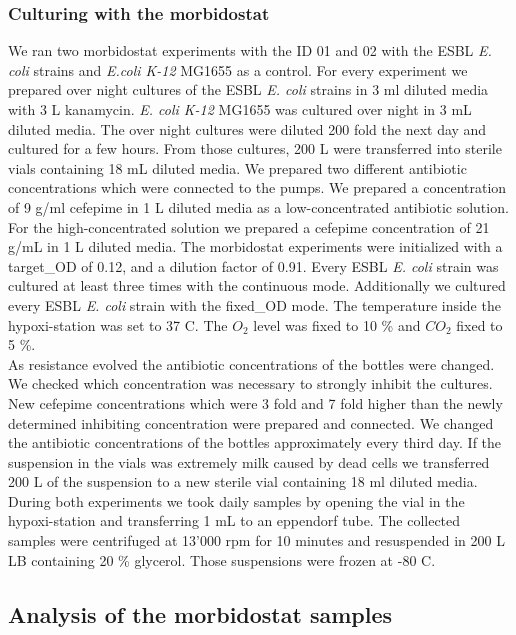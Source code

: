 \subsubsection{Culturing with the morbidostat}
We ran two morbidostat experiments with the ID 01 and 02 with the ESBL \textit{E. coli} strains and \textit{E.coli K-12} MG1655 as a control. For every experiment we prepared over night cultures of the ESBL \textit{E. coli} strains in 3 ml diluted media with 3 \textmu L kanamycin. \textit{E. coli K-12} MG1655 was cultured over night in 3 mL diluted media. The over night cultures were diluted 200 fold the next day and cultured for a few hours. From those cultures, 200 \textmu L were transferred into sterile vials containing 18 mL diluted media. We prepared two different antibiotic concentrations which were connected to the pumps. We prepared a concentration of 9 \textmu g/ml cefepime in 1 L diluted media as a low-concentrated antibiotic solution. For the high-concentrated solution we prepared a cefepime concentration of 21 \textmu g/mL in 1 L diluted media. The morbidostat experiments were initialized with a target\_OD of 0.12, and a dilution factor of 0.91. Every ESBL \textit{E. coli} strain was cultured at least three times with the continuous mode. Additionally we cultured every ESBL \textit{E. coli} strain with the fixed\_OD mode. The temperature inside the hypoxi-station was set to 37 \degree C. The $O_2$ level was fixed to 10 \% and $CO_2$ fixed to 5 \%. \\
As resistance evolved the antibiotic concentrations of the bottles were changed. We checked which concentration was necessary to strongly inhibit the cultures. New cefepime concentrations which were 3 fold and 7 fold higher than the newly determined inhibiting concentration were prepared and connected. We changed the antibiotic concentrations of the bottles approximately every third day. If the suspension in the vials was extremely milk caused by dead cells we transferred 200 \textmu L of the suspension to a new sterile vial containing 18 ml diluted media.  \\
During both experiments we took daily samples by opening the vial in the hypoxi-station and transferring 1 mL to an eppendorf tube. The collected samples were centrifuged at 13'000 rpm for 10 minutes and resuspended in 200 \textmu L LB containing 20 \% glycerol. Those suspensions were frozen at -80 \degree C.\\

\subsection{Analysis of the morbidostat samples}
